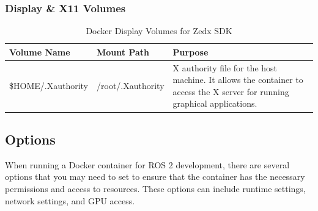 \begin{landscape}
\subsubsection{Display \& X11 Volumes}

\begin{table}[H]
    \centering
    \begin{tabular}{|l|l|p{9cm}|}
        \hline
        \textbf{Volume Name} & \textbf{Mount Path} & \textbf{Purpose} \\
        \hline
        \${HOME}/.Xauthority & /root/.Xauthority & X authority file for the host machine. It allows the container to access the X server for running graphical applications. \\
        \hline
    \end{tabular}
    \caption{Docker Display Volumes for Zedx SDK}
    \label{tab:docker-volumes-display}
\end{table}

\end{landscape}

\subsection{Options}

When running a Docker container for ROS 2 development, there are several options that you may need to set to ensure that the container has the necessary permissions and access to resources. These options can include runtime settings, network settings, and GPU access.

